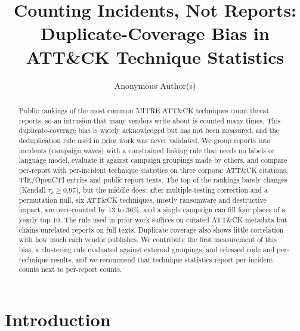 \documentclass[runningheads]{llncs}
\newcommand{\attack}{ATT\&CK}
\begin{document}
\title{Counting Incidents, Not Reports:\\ Duplicate-Coverage Bias in {ATT\&CK} Technique Statistics}
\author{Anonymous Author(s)}

\maketitle

\begin{abstract}
Public rankings of the most common MITRE \attack{} techniques count threat reports, so an intrusion that many vendors write about is counted many times. This duplicate-coverage bias is widely acknowledged but has not been measured, and the deduplication rule used in prior work was never validated. We group reports into incidents (campaign waves) with a constrained linking rule that needs no labels or language model, evaluate it against campaign groupings made by others, and compare per-report with per-incident technique statistics on three corpora: \attack{} citations, TIE/OpenCTI entries and public report texts. The top of the rankings barely changes (Kendall $\tau_b \geq 0.97$), but the middle does: after multiple-testing correction and a permutation null, six \attack{} techniques, mostly ransomware and destructive impact, are over-counted by 13 to 36\%, and a single campaign can fill four places of a yearly top-10. The rule used in prior work suffices on curated \attack{} metadata but chains unrelated reports on full texts. Duplicate coverage also shows little correlation with how much each vendor publishes. We contribute the first measurement of this bias, a clustering rule evaluated against external groupings, and released code and per-technique results, and we recommend that technique statistics report per-incident counts next to per-report counts.

\end{abstract}

\section{Introduction}
\end{document}
